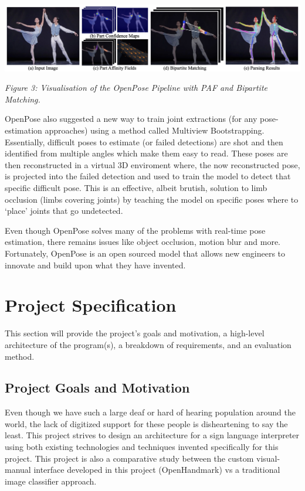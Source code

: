 \documentclass[11pt]{article}
\begin{document}
        \vskip 0.2cm
        \begin{center}
            \includegraphics[width=14cm]{images/openpose.png}
            \\
            \raggedright \textit{
            Figure 3: Visualisation of the OpenPose Pipeline with PAF and Bipartite Matching.
            }
            \cite{openpose}
        \end{center}
        \vskip 0.2cm

        OpenPose also suggested a new way to train joint extractions (for any pose-estimation approaches) using a method called Multiview Bootstrapping. Essentially, difficult poses to estimate (or failed detections) are shot and then identified from multiple angles which make them easy to read. These poses are then reconstructed in a virtual 3D enviroment where, the now reconstructed pose, is projected into the failed detection and used to train the model to detect that specific difficult pose. This is an effective, albeit brutish, solution to limb occlusion (limbs covering joints) by teaching the model on specific poses where to `place' joints that go undetected.

        Even though OpenPose solves many of the problems with real-time pose estimation, there remains issues like object occlusion, motion blur and more. Fortunately, OpenPose is an open sourced model that allows new engineers to innovate and build upon what they have invented.


\section{Project Specification}
    This section will provide the project's goals and motivation, a high-level architecture of the program(s), a breakdown of requirements, and an evaluation method.

    \subsection{Project Goals and Motivation}
        Even though we have such a large deaf or hard of hearing population around the world, the lack of digitized support for these people is disheartening to say the least. This project strives to design an architecture for a sign language interpreter using both existing technologies and techniques invented specifically for this project. This project is also a comparative study between the custom visual-manual interface developed in this project (OpenHandmark) vs a traditional image classifier approach.
    
\end{document}
